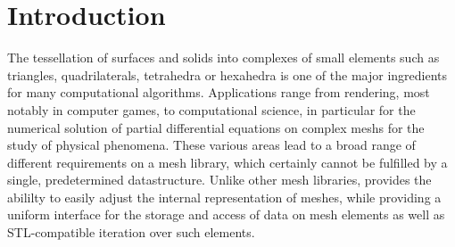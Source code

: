 
\chapter*{Introduction}    \label{intro}

The tessellation of surfaces and solids into complexes of small elements such as triangles, quadrilaterals, tetrahedra or hexahedra is one of the major ingredients for many computational algorithms.
Applications range from rendering, most notably in computer games, to computational science, in particular for the numerical solution of partial differential equations on complex meshs for the study of physical phenomena.
These various areas lead to a broad range of different requirements on a mesh library, which certainly cannot be fulfilled by a single, predetermined datastructure.
Unlike other mesh libraries, {\ViennaGrid} provides the abililty to easily adjust the internal representation of meshes, while providing a uniform interface for the storage and access of data on mesh elements as well as STL-compatible iteration over such elements.

